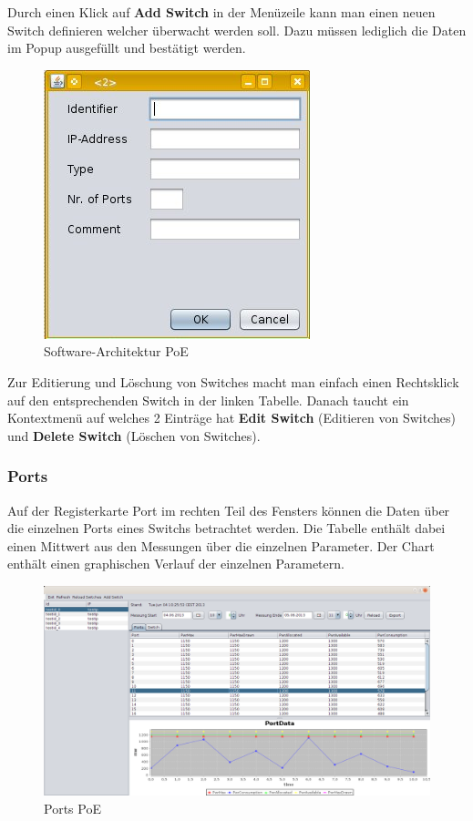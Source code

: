 Durch einen Klick auf \textbf{Add Switch} in der Menüzeile kann man einen neuen
Switch definieren welcher überwacht werden soll. Dazu müssen lediglich die Daten
im Popup ausgefüllt und bestätigt werden. 

 \begin{figure}[h]
    \centering
    \leavevmode
    \includegraphics[scale=0.5]{figures/screenshot3.jpg}
    \caption{Software-Architektur PoE}
    \label{fig:NeuerSwitch-PoE}
\end{figure}

Zur Editierung und Löschung von Switches macht man einfach einen Rechtsklick auf
den entsprechenden Switch in der linken Tabelle. Danach taucht ein Kontextmenü
auf welches 2 Einträge hat \textbf{Edit Switch} (Editieren von Switches) und
\textbf{Delete Switch} (Löschen von Switches).

\subsubsection{Ports}

Auf der Registerkarte Port im rechten Teil des Fensters können die Daten über
die einzelnen Ports eines Switchs betrachtet werden. Die Tabelle enthält dabei
einen Mittwert aus den Messungen über die einzelnen Parameter. Der Chart enthält
einen graphischen Verlauf der einzelnen Parametern.

\begin{figure}[h]
    \centering
    \leavevmode
    \includegraphics[width=1.0\linewidth]{figures/screenshot1.png}
    \caption{Ports PoE}
    \label{fig:Ports-PoE}
\end{figure}

